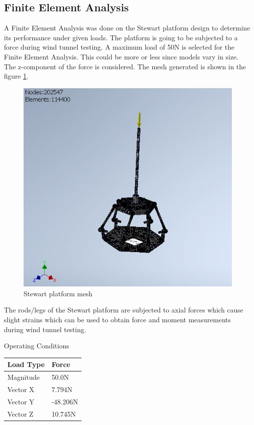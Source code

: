 \subsection{Finite Element Analysis}
A Finite Element Analysis was done on the Stewart platform design to determine its performance under given loads. The platform is going to be subjected to a force during wind tunnel testing. A maximum load of 50N is selected for the Finite Element Analysis. This could be more or less since models vary in size. The z-component of the force is considered. 
The mesh generated is shown in the figure \ref{fig:feamesh}.
\begin{center}
	\begin{figure}[H]
	\centering
	\includegraphics[width=0.75\linewidth]{Figures/FEA}
	\caption[Stewart platform mesh]{Stewart platform mesh}
	\label{fig:feamesh}
	\end{figure}
\end{center}
The rods/legs of the Stewart platform are subjected to axial forces which cause slight strains which can be used to obtain force and moment measurements during wind tunnel testing.
\clearpage
\begin{center}
\begin{table}[H]
\caption{Operating Conditions}
\centering
\end{table}
\begin{tabular}{|l|l|}
\hline
\textbf{Load Type} & \textbf{Force}\\
\hline
Magnitude & 50.0N\\
\hline
Vector X & 7.794N\\
\hline
Vector Y & -48.206N\\
\hline
Vector Z & 10.745N\\
\hline
\end{tabular}
\end{center}


